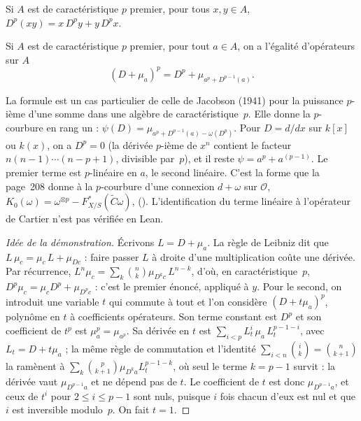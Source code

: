 \begin{enonce}
Si $A$ est de caractéristique $p$ premier, pour tous $x, y \in A$, $D^p(xy) = x\,D^p y + y\,D^p x$.
\end{enonce}

\begin{enonce}
Si $A$ est de caractéristique $p$ premier, pour tout $a \in A$, on a l'égalité d'opérateurs sur $A$
\[
(D + \mu_a)^p = D^p + \mu_{a^p + D^{p-1}(a)} .
\]
\end{enonce}

La formule est un cas particulier de celle de Jacobson (1941) \cite{jacobson1941} pour la puissance $p$-ième d'une somme dans une algèbre de caractéristique~$p$. Elle donne la $p$-courbure en rang un : $\psi(D) = \mu_{a^p + D^{p-1}(a) - \omega(D^p)}$. Pour $D = d/dx$ sur $k[x]$ ou $k(x)$, on a $D^p = 0$ (la dérivée $p$-ième de $x^n$ contient le facteur $n(n-1)\cdots(n-p+1)$, divisible par~$p$), et il reste $\psi = a^p + a^{(p-1)}$. Le premier terme est $p$-linéaire en $a$, le second linéaire. C'est la forme que la page~208 donne à la $p$-courbure d'une connexion $d + \omega$ sur $\mathcal O$, $K_0(\omega) = \omega^{\otimes p} - F^*_{X/S}(\widetilde C\omega)$,  (). L'identification du terme linéaire à l'opérateur de Cartier n'est pas vérifiée en Lean.

\begin{proof}[Idée de la démonstration]
Écrivons $L = D + \mu_a$. La règle de Leibniz dit que $L\,\mu_c = \mu_c\,L + \mu_{Dc}$ : faire passer $L$ à droite d'une multiplication coûte une dérivée. Par récurrence, $L^n \mu_c = \sum_k \binom nk \mu_{D^k c}\,L^{n-k}$, d'où, en caractéristique~$p$, $D^p \mu_c = \mu_c D^p + \mu_{D^p c}$ : c'est le premier énoncé, appliqué à $y$. Pour le second, on introduit une variable $t$ qui commute à tout et l'on considère $(D + t\mu_a)^p$, polynôme en $t$ à coefficients opérateurs. Son terme constant est $D^p$ et son coefficient de $t^p$ est $\mu_a^p = \mu_{a^p}$. Sa dérivée en $t$ est $\sum_{i<p} L_t^i\,\mu_a\,L_t^{p-1-i}$, avec $L_t = D + t\mu_a$ ; la même règle de commutation et l'identité $\sum_{i<n}\binom ik = \binom n{k+1}$ la ramènent à $\sum_k \binom p{k+1} \mu_{D^k a} L_t^{p-1-k}$, où seul le terme $k = p - 1$ survit : la dérivée vaut $\mu_{D^{p-1} a}$ et ne dépend pas de $t$. Le coefficient de $t$ est donc $\mu_{D^{p-1}a}$, et ceux de $t^i$ pour $2 \leq i \leq p-1$ sont nuls, puisque $i$ fois chacun d'eux est nul et que $i$ est inversible modulo~$p$. On fait $t = 1$.
\end{proof}

